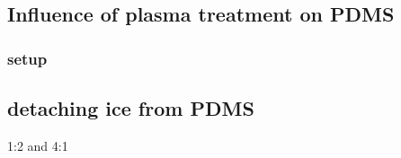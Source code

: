 \subsection{Influence of plasma treatment on PDMS}

\subsubsection{setup}

\subsection{detaching ice from PDMS}

1:2 and 4:1

